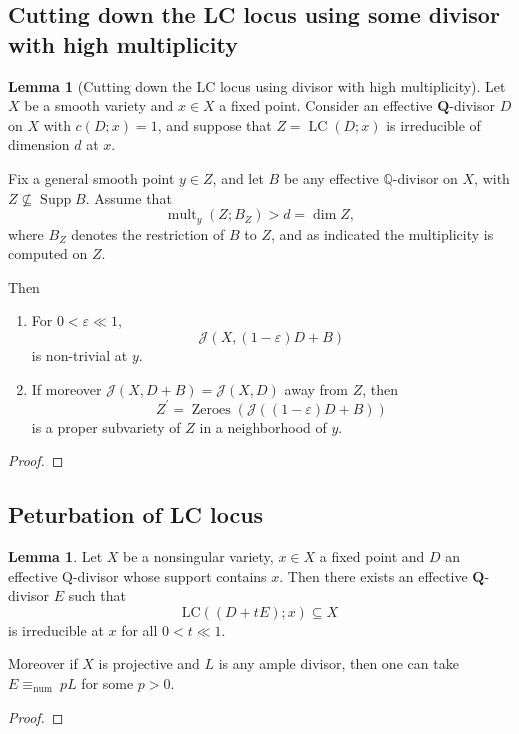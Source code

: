 \documentclass[11pt]{article}
\theoremstyle{definition}
\newtheorem{lemma}[theorem]{Lemma}
\begin{document}
	\subsection{Cutting down the LC locus using some divisor with high multiplicity}
	\begin{lemma}[Cutting down the LC locus using divisor with high multiplicity]\label{cutLC}
		Let $X$ be a smooth variety and $x \in X$ a fixed point. Consider an effective $\mathbf{Q}$-divisor $D$ on $X$ with $c(D ; x)=1$, and suppose that $Z=\operatorname{LC}(D ; x)$ is irreducible of dimension $d$ at $x$. 
		
		Fix a general smooth point $y \in Z$, and let $B$ be any effective $\mathbb{Q}$-divisor on $X$, with $Z \nsubseteq \operatorname{Supp} B$. Assume that
		$$
		\operatorname{mult}_y\left(Z ; B_Z\right)>d=\operatorname{dim} Z,
		$$
		where $B_Z$ denotes the restriction of $B$ to $Z$, and as indicated the multiplicity is computed on $Z$. 
		
		Then 
		\begin{enumerate}
			\item For $0<\varepsilon \ll 1$,
			$$
			\mathcal{J}(X,(1-\varepsilon) D+B)
			$$
			is non-trivial at $y$.
			\item If moreover $\mathcal{J}(X, D+B)=\mathcal{J}(X, D)$ away from $Z$, then
			$$
			Z^{\prime}= \operatorname{Zeroes}(\mathcal{J}((1-\varepsilon) D+B))
			$$
			is a proper subvariety of $Z$ in a neighborhood of $y$.
		\end{enumerate} 
	\end{lemma}
	\begin{proof}
		
	\end{proof}
	\subsection{Peturbation of LC locus}
	\begin{lemma}	
		Let $X$ be a nonsingular variety, $x \in X$ a fixed point and $D$ an effective $\mathrm{Q}$-divisor whose support contains $x$. Then there exists an effective $\mathbf{Q}$-divisor $E$ such that
		$$
		\mathrm{LC}((D+t E) ; x) \subseteq X
		$$
		is irreducible at $x$ for all $0<t \ll 1$. 
		
		Moreover if $X$ is projective and $L$ is any ample divisor, then one can take $E \equiv_{\text {num }} p L$ for some $p>0$.
	\end{lemma}
	\begin{proof}
		
	\end{proof}
\end{document}

